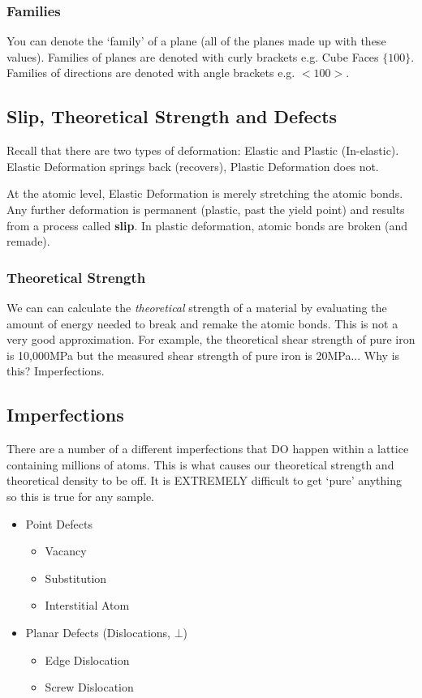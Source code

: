 \documentclass[12pt]{article}
\begin{document}
\subsubsection{Families}
You can denote the `family' of a plane (all of the planes made up with these values). 
Families of planes are denoted with curly brackets e.g. Cube Faces $\{100\}$.
Families of directions are denoted with angle brackets e.g. $<100>$.

\subsection{Slip, Theoretical Strength and Defects}
Recall that there are two types of deformation: Elastic and Plastic (In-elastic).
Elastic Deformation springs back (recovers), Plastic Deformation does not.

At the atomic level, Elastic Deformation is merely stretching the atomic bonds.
Any further deformation is permanent (plastic, past the yield point) and results from a process called \textbf{slip}.
In plastic deformation, atomic bonds are broken (and remade).

\subsubsection{Theoretical Strength}
We can can calculate the \textit{theoretical} strength of a material by evaluating the amount of energy needed to break and remake the atomic bonds.
This is not a very good approximation. For example, the theoretical shear strength of pure iron is 10,000MPa but the measured shear strength of pure iron is 20MPa...
Why is this? Imperfections.

\subsection{Imperfections}
There are a number of a different imperfections that DO happen within a lattice containing millions of atoms.
This is what causes our theoretical strength and theoretical density to be off. 
It is EXTREMELY difficult to get `pure' anything so this is true for any sample.

\begin{itemize}
  \item Point Defects
    \begin{itemize}
      \item Vacancy
      \item Substitution
      \item Interstitial Atom
    \end{itemize}
  \item Planar Defects (Dislocations, $\bot$)
    \begin{itemize}
      \item Edge Dislocation
      \item Screw Dislocation
    \end{itemize}
\end{itemize}
\end{document}
